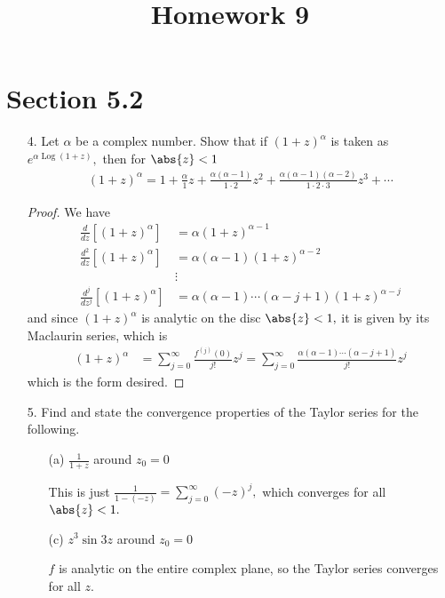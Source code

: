 \documentclass{article}
\DeclareMathOperator{\Log}{Log}
\begin{document}
\title{Homework 9}
\maketitle
\thispagestyle{fancy}

\section*{Section 5.2}

\begin{itemize}
	\item[4.] Let $\alpha$ be a complex number. Show that if $(1+z)^\alpha$ is taken as $e^{\alpha\Log(1+z)},$ then for $\abs{z}<1$
		\begin{align*}
			(1+z)^\alpha = 1+\frac{\alpha}{1}z + \frac{\alpha(\alpha-1)}{1\cdot 2}z^2 + \frac{\alpha(\alpha-1)(\alpha-2)}{1\cdot 2\cdot 3}z^3 + \cdots
		\end{align*}
		\begin{proof}
			We have
			\begin{align*}
				\frac{d}{dz}\left[ (1+z)^\alpha \right] &= \alpha(1+z)^{\alpha-1} \\
				\frac{d^2}{dz} \left[ (1+z)^\alpha \right] &= \alpha(\alpha-1) (1+z)^{\alpha-2} \\
				&\vdots \\
				\frac{d^j}{dz^j} \left[ (1+z)^\alpha \right] &= \alpha(\alpha-1)\cdots(\alpha-j+1) (1+z)^{\alpha-j}
			\end{align*}
			and since $(1+z)^\alpha$ is analytic on the disc $\abs{z}<1,$ it is given by its Maclaurin series, which is
			\begin{align*}
				(1+z)^\alpha &= \sum_{j=0}^{\infty} \frac{f^{(j)}(0)}{j!}z^j= \sum_{j=0}^{\infty} \frac{\alpha(\alpha-1)\cdots(\alpha-j+1)}{j!}z^j
			\end{align*}
			which is the form desired.
		\end{proof}

	\item[5.] Find and state the convergence properties of the Taylor series for the following.
		\begin{itemize}
			\item[(a)] $\frac{1}{1+z}$ around $z_0=0$
				\begin{soln}
					This is just $\frac{1}{1-(-z)}= \sum_{j=0}^{\infty} (-z)^j,$ which converges for all $\abs{z}<1.$
				\end{soln}

			\item[(c)] $z^3\sin 3z$ around $z_0=0$
				\begin{soln}
					$f$ is analytic on the entire complex plane, so the Taylor series converges for all $z.$
				\end{soln}


\end{itemize}
\end{itemize}
\end{document}
